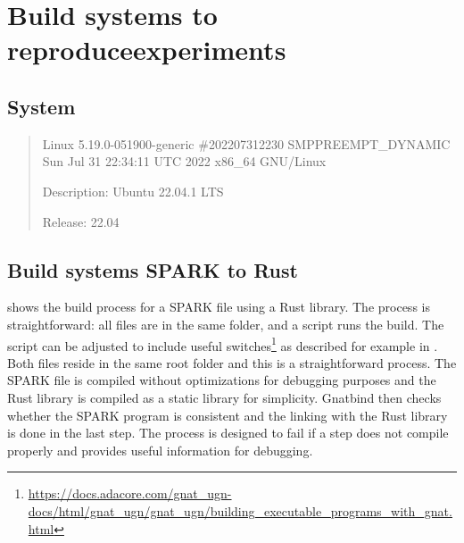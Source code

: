 \documentclass[nomenclature, english, bibtex]{kththesis}
\begin{document}
{\chapter[Build systems to reproduce experiments]{Build systems to reproduce\linebreak[4] experiments}
\label{sec:buildSystems}


\section{System}
\begin{quote}
Linux 5.19.0-051900-generic \#202207312230 SMP\linebreak[4] PREEMPT\_DYNAMIC Sun Jul 31 22:34:11 UTC 2022 x86\_64 GNU/Linux

Description: Ubuntu 22.04.1 LTS

Release:	22.04
\end{quote}




\section{Build systems SPARK to Rust}

 shows the build process for a SPARK file using a Rust library. The process is straightforward: all files are in the same folder, and a script runs the build. The script can be adjusted to include useful switches\footnote{\url{https://docs.adacore.com/gnat_ugn-docs/html/gnat_ugn/gnat_ugn/building_executable_programs_with_gnat.html}} as described for example in . 
Both files reside in the same root folder and this is a straightforward process. 
The SPARK file is compiled without optimizations for debugging purposes and the Rust library is compiled as a static library for simplicity. 
Gnatbind then checks whether the SPARK program is consistent and the linking with the Rust library is done in the last step.
The process is designed to fail if a step does not compile properly and provides useful information for debugging.

}
\end{document}
